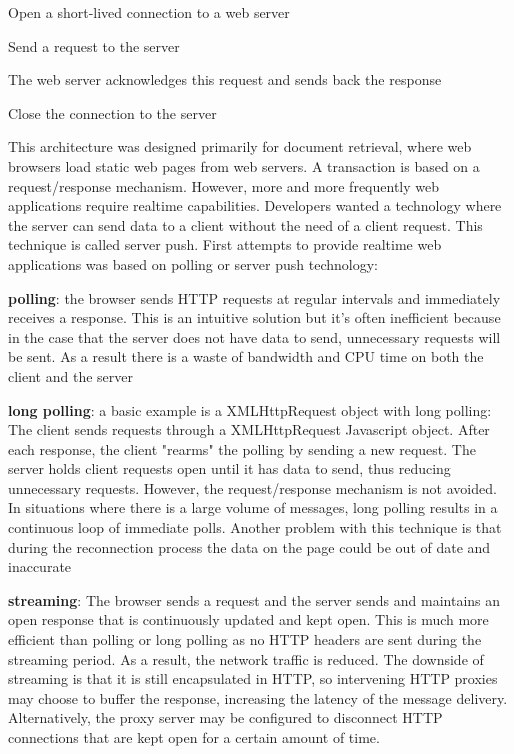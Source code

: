 \documentclass[pdftex,10pt,a4paper]{report}
\newenvironment{packed_item}{
\begin{itemize}
  \setlength{\itemsep}{1pt}
  \setlength{\parskip}{0pt}
  \setlength{\parsep}{0pt}
}{\end{itemize}}
\begin{document}
\begin{packed_item}
	\item Open a short-lived connection to a web server
	\item Send a request to the server
	\item The web server acknowledges this request and sends back the response
	\item Close the connection to the server
\end{packed_item}

This architecture was designed primarily for document retrieval, where web browsers load static web pages from web servers. A transaction is based on a request/response mechanism. However, more and more frequently web applications require realtime capabilities. Developers wanted a technology where the server can send data to a client without the need of a client request. This technique is called server push. First attempts to provide realtime web applications was based on polling or server push technology:
\begin{packed_item}
	\item \textbf{polling}: the browser sends HTTP requests at regular intervals and immediately receives a response. This is an intuitive solution but it's often inefficient because in the case that the server does not have data to send, unnecessary requests will be sent. As a result there is a waste of bandwidth and CPU time on both the client and the server
	\item \textbf{long polling}: a basic example is a XMLHttpRequest object with long polling: The client sends requests through a XMLHttpRequest Javascript object. After each response, the client "rearms" the polling by sending a new request. The server holds client requests open until it has data to send, thus reducing unnecessary requests. However, the request/response mechanism is not avoided. In situations where there is a large volume of messages, long polling results in a continuous loop of immediate polls. Another problem with this technique is that during the reconnection process the data on the page could be out of date and inaccurate
	\item \textbf{streaming}: The browser sends a request and the server sends and maintains an open response that is continuously updated and kept open. This is much more efficient than polling or long polling as no HTTP headers are sent during the streaming period. As a result, the network traffic is reduced. The downside of streaming is that it is still encapsulated in HTTP, so intervening HTTP proxies may choose to buffer the response, increasing the latency of the message delivery. Alternatively, the proxy server may be configured to disconnect HTTP connections that are kept open for a certain amount of time.
\end{packed_item}
\end{document}
